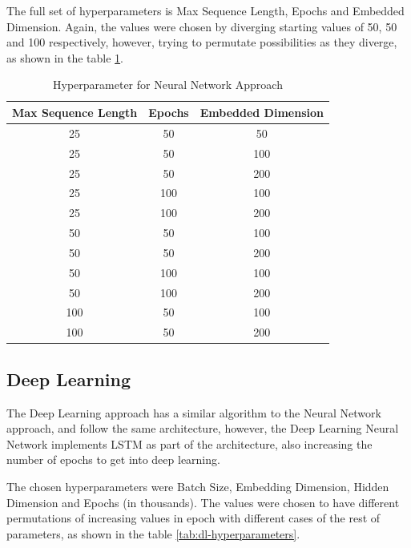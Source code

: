 The full set of hyperparameters is Max Sequence Length, Epochs and Embedded Dimension. Again, the values were chosen by diverging starting values of 50, 50 and 100 respectively, however, trying to permutate possibilities as they diverge, as shown in the table \ref{tab:nn-hyperparameters}.

\begin{table}[H]
\begin{center}
\begin{tabular}{||c|c|c||}
    \hline
    Max Sequence Length & Epochs & Embedded Dimension \\
    \hline
    25 & 50 & 50 \\
    25 & 50 & 100 \\
    25 & 50 & 200 \\
    25 & 100 & 100 \\
    25 & 100 & 200 \\
    50 & 50 & 100 \\
    50 & 50 & 200 \\
    50 & 100 & 100 \\
    50 & 100 & 200 \\
    100 & 50 & 100 \\
    100 & 50 & 200 \\
    \hline
\end{tabular}
\caption[Neural Network Hyperparameters]{Hyperparameter for Neural Network Approach}
\label{tab:nn-hyperparameters}
\end{center}
\end{table}


\subsection{Deep Learning}

The Deep Learning approach has a similar algorithm to the Neural Network approach, and follow the same architecture, however, the Deep Learning Neural Network implements LSTM as part of the architecture, also increasing the number of epochs to get into deep learning. 

The chosen hyperparameters were Batch Size, Embedding Dimension, Hidden Dimension and Epochs (in thousands). The values were chosen to have different permutations of increasing values in epoch with different cases of the rest of parameters, as shown in the table \ref{tab:dl-hyperparameters}.

